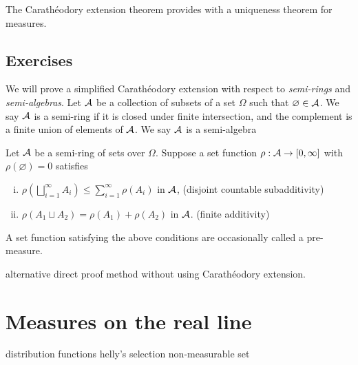 \documentclass{../note}
\begin{document}
\begin{prb}
The Carath\'eodory extension theorem provides with a uniqueness theorem for measures.
\end{prb}
\begin{pf}
\end{pf}


\section*{Exercises}

\begin{prb}
We will prove a simplified Carath\'eodory extension with respect to \emph{semi-rings} and \emph{semi-algebras}.
Let $\mathcal{A}$ be a collection of subsets of a set $\Omega$ such that $\varnothing\in\mathcal{A}$.
We say $\mathcal{A}$ is a semi-ring if it is closed under finite intersection, and the complement is a finite union of elements of $\mathcal{A}$.
We say $\mathcal{A}$ is a semi-algebra

Let $\mathcal{A}$ be a semi-ring of sets over $\Omega$.
Suppose a set function $\rho:\mathcal{A}\to[0,\infty]$ with $\rho(\varnothing)=0$ satisfies
\begin{enumerate}[(i)]
\item $\rho(\bigsqcup_{i=1}^\infty A_i)\le\sum_{i=1}^\infty\rho(A_i)$ in $\mathcal{A}$,
\hfill(disjoint countable subadditivity)
\item $\rho(A_1\sqcup A_2)=\rho(A_1)+\rho(A_2)$ in $\mathcal{A}$.
\hfill(finite additivity)
\end{enumerate}
A set function satisfying the above conditions are occasionally called a pre-measure.
\begin{parts}
\item
\item 
\end{parts}
\end{prb}

\begin{prb}
alternative direct proof method without using Carath\'eodory extension.
\end{prb}






\chapter{Measures on the real line}

distribution functions
helly's selection
non-measurable set
\end{document}
